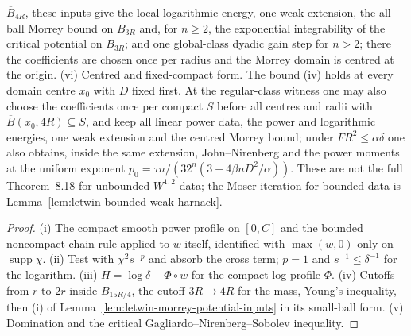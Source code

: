 \begin{lemma}
  $\overline B_{4R}$, these inputs give the local logarithmic energy, one weak extension, the all-ball Morrey bound on $B_{3R}$ and, for
  $n\ge2$, the exponential integrability of the critical potential on $B_{3R}$; and one global-class dyadic gain step for
  $n>2$; there the coefficients are chosen once per radius and the Morrey domain is centred at the origin.
  (vi) Centred and fixed-compact form. The bound (iv) holds at every domain centre $x_0$ with $D$ fixed first. At the regular-class witness one may also
  choose the coefficients once per compact $S$ before all centres and radii with $\overline B(x_0,4R)\subseteq S$, and keep
  all linear power data, the power and logarithmic energies, one weak extension and the centred Morrey bound; under
  $FR^2\le\alpha\delta$ one also obtains, inside the same extension, John--Nirenberg and the power moments at the uniform exponent
  $p_0=\tau n/(32^n(3+4\beta nD^2/\alpha))$. These are not the full Theorem~8.18 for unbounded $W^{1,2}$ data; the Moser iteration
  for bounded data is Lemma~\ref{lem:letwin-bounded-weak-harnack}.
\end{lemma}
\begin{proof}
  \leanok
  (i) The compact smooth power profile on $[0,C]$ and the bounded noncompact chain rule applied to $w$ itself, identified
  with $\max(w,0)$ only on $\operatorname{supp}\chi$. (ii) Test with $\chi^2s^{-p}$ and absorb the cross term; $p=1$ and
  $s^{-1}\le\delta^{-1}$ for the logarithm. (iii) $H=\log\delta+\Phi\circ w$ for the compact log profile $\Phi$. (iv) Cutoffs
  from $r$ to $2r$ inside $B_{15R/4}$, the cutoff $3R\to4R$ for the mass, Young's inequality, then (i) of
  Lemma~\ref{lem:letwin-morrey-potential-inputs} in its small-ball form. (v) Domination and the critical Gagliardo--Nirenberg--Sobolev inequality.
\end{proof}

